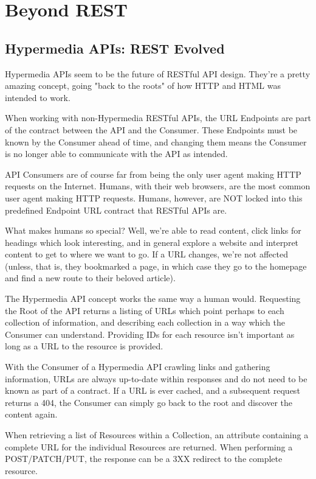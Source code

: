 \documentclass{book}
\begin{document}
\chapter{Beyond REST}

\section{Hypermedia APIs: REST Evolved}

Hypermedia APIs seem to be the future of RESTful API design. They're a pretty amazing concept, going "back to the roots" of how HTTP and HTML was intended to work.

When working with non-Hypermedia RESTful APIs, the URL Endpoints are part of the contract between the API and the Consumer. These Endpoints must be known by the Consumer ahead of time, and changing them means the Consumer is no longer able to communicate with the API as intended.

API Consumers are of course far from being the only user agent making HTTP requests on the Internet. Humans, with their web browsers, are the most common user agent making HTTP requests. Humans, however, are NOT locked into this predefined Endpoint URL contract that RESTful APIs are.

What makes humans so special? Well, we're able to read content, click links for headings which look interesting, and in general explore a website and interpret content to get to where we want to go. If a URL changes, we're not affected (unless, that is, they bookmarked a page, in which case they go to the homepage and find a new route to their beloved article).

The Hypermedia API concept works the same way a human would. Requesting the Root of the API returns a listing of URLs which point perhaps to each collection of information, and describing each collection in a way which the Consumer can understand. Providing IDs for each resource isn't important as long as a URL to the resource is provided.

With the Consumer of a Hypermedia API crawling links and gathering information, URLs are always up-to-date within responses and do not need to be known as part of a contract. If a URL is ever cached, and a subsequent request returns a 404, the Consumer can simply go back to the root and discover the content again.

When retrieving a list of Resources within a Collection, an attribute containing a complete URL for the individual Resources are returned. When performing a POST/PATCH/PUT, the response can be a 3XX redirect to the complete resource.
\end{document}
